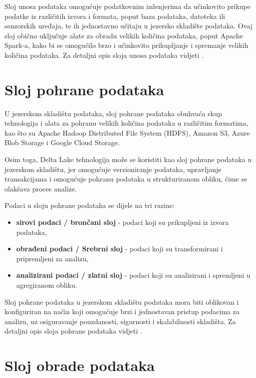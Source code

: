 Sloj unosa podataka omogućuje podatkovnim inženjerima da učinkovito prikupe
podatke iz različitih izvora i formata, poput baza podataka, datoteka ili
senzorskih uređaja, te ih jednostavno učitaju u jezersko skladište podataka.
Ovaj sloj obično uključuje alate za obradu velikih količina podataka, poput
Apache Spark-a, kako bi se omogućilo brzo i učinkovito prikupljanje i spremanje
velikih količina podataka. Za detaljni opis sloja unosa podataka vidjeti
\cite{datalakehouse2022}.

\section{Sloj pohrane podataka} \label{section:sloj_pohrane_podataka}

U jezerskom skladištu podataka, sloj pohrane podataka obuhvaća skup tehnologija
i alata za pohranu velikih količina podataka u različitim formatima, kao što su
Apache Hadoop Distributed File System (HDFS), Amazon S3, Azure Blob Storage i
Google Cloud Storage.

Osim toga, Delta Lake tehnologija može se koristiti kao sloj pohrane podataka u
jezerskom skladištu, jer omogućuje verzioniranje podataka, upravljanje
transakcijama i omogućuje pohranu podataka u strukturiranom obliku, čime se
olakšava proces analize.

Podaci u sloju pohrane podataka se dijele na tri razine:
\begin{itemize}
    \item \textbf{sirovi podaci / brončani sloj} - podaci koji su prikupljeni iz izvora podataka,
    \item \textbf{obrađeni podaci / Srebrni sloj} - podaci koji su transformirani i pripremljeni za analizu,
    \item \textbf{analizirani podaci / zlatni sloj} - podaci koji su analizirani i spremljeni u agregiranom obliku.
\end{itemize}

Sloj pohrane podataka u jezerskom skladištu podataka mora biti oblikovan i
konfiguriran na način koji omogućuje brzi i jednostavan pristup podacima za
analizu, uz osiguravanje pouzdanosti, sigurnosti i skalabilnosti skladišta. Za
detaljni opis sloja pohrane podataka vidjeti \cite{datalakehouse2022}.

\section{Sloj obrade podataka} \label{section:sloj_obrade_podataka} 

